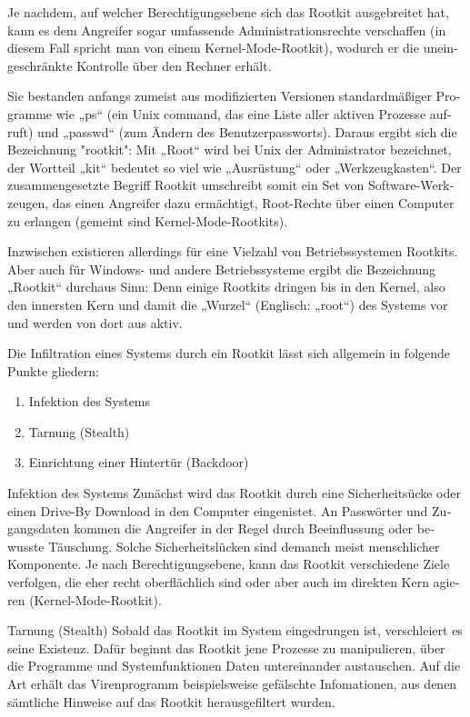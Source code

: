 \begin{otherlanguage}{ngerman}
    Je nachdem, auf welcher Berechtigungsebene sich das Rootkit ausgebreitet hat, kann es dem Angreifer sogar umfassende Administrationsrechte verschaffen (in diesem Fall spricht man von einem Kernel-Mode-Rootkit), wodurch er die uneingeschränkte Kontrolle über den Rechner erhält.
    
    Sie bestanden anfangs zumeist aus modifizierten Versionen standardmäßiger Programme wie „ps“ (ein Unix command, das eine Liste aller aktiven Prozesse aufruft) und „passwd“ (zum Ändern des Benutzerpassworts). Daraus ergibt sich die Bezeichnung "rootkit": Mit „Root“ wird bei Unix der Administrator bezeichnet, der Wortteil „kit“ bedeutet so viel wie „Ausrüstung“ oder „Werkzeugkasten“. Der zusammengesetzte Begriff Rootkit umschreibt somit ein Set von Software-Werkzeugen, das einen Angreifer dazu ermächtigt, Root-Rechte über einen Computer zu erlangen (gemeint sind Kernel-Mode-Rootkits).

    Inzwischen existieren allerdings für eine Vielzahl von Betriebssystemen Rootkits. Aber auch für Windows- und andere Betriebssysteme ergibt die Bezeichnung „Rootkit“ durchaus Sinn: Denn einige Rootkits dringen bis in den Kernel, also den innersten Kern und damit die „Wurzel“ (Englisch: „root“) des Systems vor und werden von dort aus aktiv.
    
    Die Infiltration eines Systems durch ein Rootkit lässt sich allgemein in folgende Punkte gliedern:
    \begin{enumerate}
        \item Infektion des Systems
        \item Tarnung (Stealth)
        \item Einrichtung einer Hintertür (Backdoor)
    \end{enumerate}
    
    Infektion des Systems
    \newline Zunächst wird das Rootkit durch eine Sicherheitsücke oder einen Drive-By Download in den Computer eingenistet. An Passwörter und Zugangsdaten kommen die Angreifer in der Regel durch Beeinflussung oder bewusste Täuschung. Solche Sicherheitslücken sind demanch meist menschlicher Komponente. Je nach Berechtigungsebene, kann das Rootkit verschiedene Ziele verfolgen, die eher recht oberflächlich sind oder aber auch im direkten Kern agieren (Kernel-Mode-Rootkit).
    
    Tarnung (Stealth)
    \newline Sobald das Rootkit im System eingedrungen ist, verschleiert es seine Existenz. Dafür beginnt das Rootkit jene Prozesse zu manipulieren, über die Programme und Systemfunktionen Daten untereinander austauschen. Auf die Art erhält das Virenprogramm beispielsweise gefälschte Infomationen, aus denen sämtliche Hinweise auf das Rootkit herausgefiltert wurden.
    

\end{otherlanguage}
